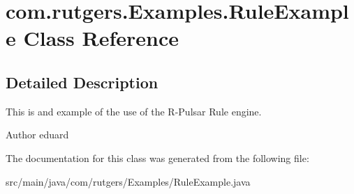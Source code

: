 \hypertarget{classcom_1_1rutgers_1_1Examples_1_1RuleExample}{}\section{com.\+rutgers.\+Examples.\+Rule\+Example Class Reference}
\label{classcom_1_1rutgers_1_1Examples_1_1RuleExample}


\subsection{Detailed Description}
This is and example of the use of the R-\/\+Pulsar Rule engine. \begin{DoxyAuthor}{Author}
eduard 
\end{DoxyAuthor}


The documentation for this class was generated from the following file\+:\begin{DoxyCompactItemize}
\item 
src/main/java/com/rutgers/\+Examples/Rule\+Example.\+java\end{DoxyCompactItemize}

